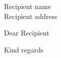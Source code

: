 \documentclass[11pt]{letter}
\date{\today}
\begin{document}
\begin{letter}{Recipient name\\Recipient address}
\opening{Dear Recipient}

\blindtext

\closing{Kind regards}


\end{letter}
\end{document}

